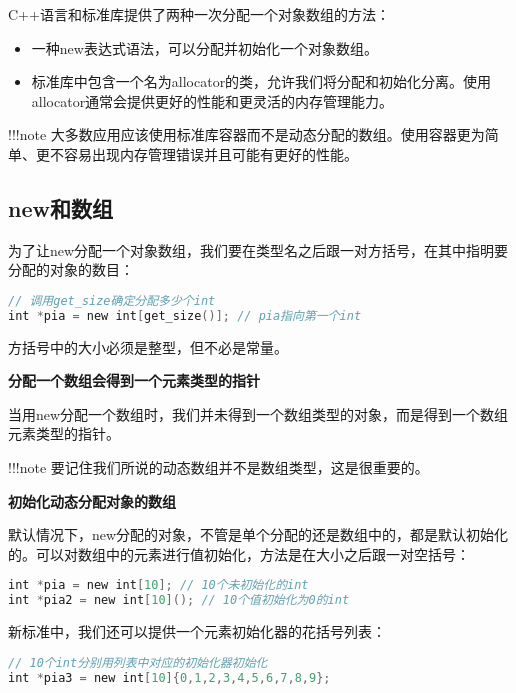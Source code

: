 \documentclass[
  a4paper,
  oneside,tablecaptionabove
]{scrbook}
\begin{document}
C++语言和标准库提供了两种一次分配一个对象数组的方法：

\begin{itemize}
\item
  一种new表达式语法，可以分配并初始化一个对象数组。
\item
  标准库中包含一个名为allocator的类，允许我们将分配和初始化分离。使用allocator通常会提供更好的性能和更灵活的内存管理能力。
\end{itemize}

!!!note
大多数应用应该使用标准库容器而不是动态分配的数组。使用容器更为简单、更不容易出现内存管理错误并且可能有更好的性能。

\subsection{new和数组}\label{newux548cux6570ux7ec4}

为了让new分配一个对象数组，我们要在类型名之后跟一对方括号，在其中指明要分配的对象的数目：

\begin{lstlisting}[language={C++}]
// 调用get_size确定分配多少个int
int *pia = new int[get_size()]; // pia指向第一个int
\end{lstlisting}

方括号中的大小必须是整型，但不必是常量。

\textbf{分配一个数组会得到一个元素类型的指针}

当用new分配一个数组时，我们并未得到一个数组类型的对象，而是得到一个数组元素类型的指针。

!!!note 要记住我们所说的动态数组并不是数组类型，这是很重要的。

\textbf{初始化动态分配对象的数组}

默认情况下，new分配的对象，不管是单个分配的还是数组中的，都是默认初始化的。可以对数组中的元素进行值初始化，方法是在大小之后跟一对空括号：

\begin{lstlisting}[language={C++}]
int *pia = new int[10]; // 10个未初始化的int
int *pia2 = new int[10](); // 10个值初始化为0的int
\end{lstlisting}

新标准中，我们还可以提供一个元素初始化器的花括号列表：

\begin{lstlisting}[language={C++}]
// 10个int分别用列表中对应的初始化器初始化
int *pia3 = new int[10]{0,1,2,3,4,5,6,7,8,9};
\end{lstlisting}
\end{document}
